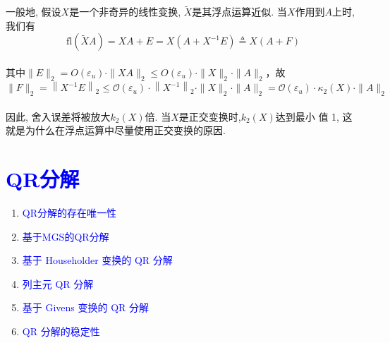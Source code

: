 \documentclass[12pt,a4paper]{article}
\begin{document}
\noindent 一般地, 假设$X$是一个非奇异的线性变换, $\tilde{X}$是其浮点运算近似. 当$X$作用到$A$上时, 我们有$$
\mathrm{fl}(\tilde{X} A)=X A+E=X\left(A+X^{-1} E\right) \triangleq X(A+F)
$$\\
其中$\|E\|_{2}=O\left(\varepsilon_{u}\right) \cdot\|X A\|_{2} \leq O\left(\varepsilon_{u}\right) \cdot\|X\|_{2} \cdot\|A\|_{2}$，故$$
\|F\|_{2}=\left\|X^{-1} E\right\|_{2} \leq \mathcal{O}\left(\varepsilon_{u}\right) \cdot\left\|X^{-1}\right\|_{2} \cdot\|X\|_{2} \cdot\|A\|_{2}=\mathcal{O}\left(\varepsilon_{u}\right) \cdot \kappa_{2}(X) \cdot\|A\|_{2}
$$\\
因此, 舍入误差将被放大$k_2(X)$倍. 当$X$是正交变换时,$k_2(X)$达到最小
值 1, 这就是为什么在浮点运算中尽量使用正交变换的原因.\\

\section{\textcolor{blue}{QR分解}}
\begin{enumerate}[3.1]
	\item \textcolor{blue}{QR分解的存在唯一性}
	\item \textcolor{blue}{基于MGS的QR分解}
	\item \textcolor{blue}{基于 Householder 变换的 QR 分解}
	\item \textcolor{blue}{列主元 QR 分解}
	\item \textcolor{blue}{基于 Givens 变换的 QR 分解}
	\item \textcolor{blue}{QR 分解的稳定性}
\end{enumerate}
\end{document}
